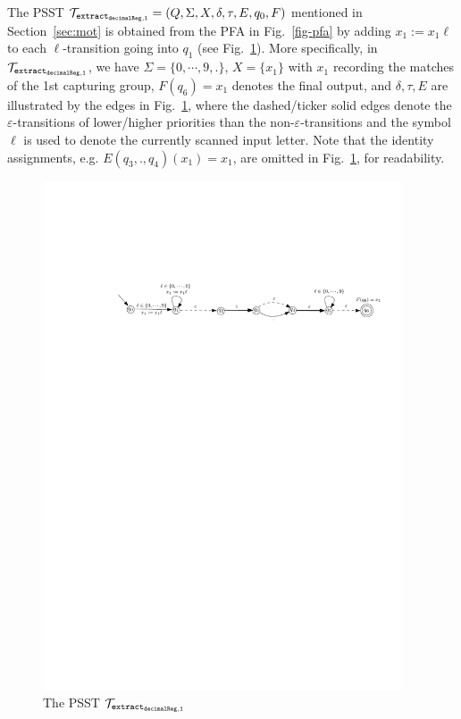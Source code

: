 \begin{example}
The PSST $\mathcal{T}_{\tt extract_{decimalReg,1}}=(Q, \Sigma, X, \delta, \tau, E,  q_{0}, F)$ mentioned in Section~\ref{sec:mot} is obtained from the PFA in Fig.~\ref{fig-pfa} by adding $x_1 := x_1 \ell$ to each $\ell$-transition going into $q_1$ (see Fig.~\ref{fig-psst-exmp}). More specifically, in $\mathcal{T}_{\tt extract_{decimalReg,1}}$, we have $\Sigma = \{0,\cdots,9, .\}$, $X= \{x_1\}$ with $x_1$ recording the matches of the 1st capturing group, $F(q_{6}) = x_1$ denotes the final output, and $\delta, \tau, E$ are illustrated by the edges in Fig.~\ref{fig-psst-exmp}, where the dashed/ticker solid edges denote the $\varepsilon$-transitions of lower/higher priorities than the non-$\varepsilon$-transitions and the symbol $\ell$ is used to denote the currently scanned input letter. Note that the identity assignments, e.g. $E(q_3, ., q_4)(x_1) = x_1$, are omitted in Fig.~\ref{fig-psst-exmp}, for readability.   

\begin{figure}[ht]
\centering
\includegraphics[width=0.95\textwidth]{psst-epsilon-exmp-new.pdf}
\caption{The PSST $\mathcal{T}_{\tt extract_{decimalReg,1}}$}
\label{fig-psst-exmp}
\end{figure}
\end{example}

  
  




